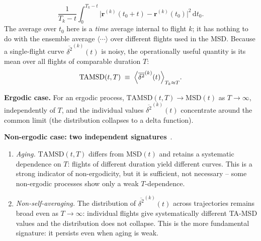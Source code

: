 \begin{description}
\begin{equation}
          \frac{1}{T_k-t}\int_0^{T_k-t}
          \bigl|\mathbf{r}^{(k)}(t_0+t)-\mathbf{r}^{(k)}(t_0)\bigr|^2\,\mathrm{d}t_0 .
        \end{equation}
        The average over $t_0$ here is a \emph{time} average internal to flight $k$; it has
        nothing to do with the ensemble average $\langle\cdots\rangle$ over different flights
        used in the MSD. Because a single-flight curve $\overline{\delta^2}^{(k)}(t)$ is
        noisy, the operationally useful quantity is its mean over all flights of comparable
        duration $T$:
        \begin{equation}
          \mathrm{TAMSD}(t,T)\;\equiv\;
          \Bigl\langle\overline{\delta^2}^{(k)}(t)\Bigr\rangle_{T_k\approx T}.
        \end{equation}

        \smallskip
        \textbf{Ergodic case.} For an ergodic process,
        $\mathrm{TAMSD}(t,T)\to\mathrm{MSD}(t)$ as $T\to\infty$, independently of $T$, and
        the individual values $\overline{\delta^2}^{(k)}(t)$ concentrate around the common
        limit (the distribution collapses to a delta function).

        \smallskip
        \textbf{Non-ergodic case: two independent signatures}~\cite{he2008}.
        \begin{enumerate}[label=(\roman*)]
          \item \emph{Aging.} $\mathrm{TAMSD}(t,T)$ differs from $\mathrm{MSD}(t)$ and
                retains a systematic dependence on $T$: flights of different duration yield
                different curves. This is a strong indicator of non-ergodicity, but it is
                sufficient, not necessary -- some non-ergodic processes show only a weak
                $T$-dependence.
          \item \emph{Non-self-averaging.} The distribution of
                $\overline{\delta^2}^{(k)}(t)$ across trajectories remains broad even as
                $T\to\infty$: individual flights give systematically different TA-MSD values
                and the distribution does not collapse. This is the more fundamental
                signature: it persists even when aging is weak.
        \end{enumerate}


\end{description}
